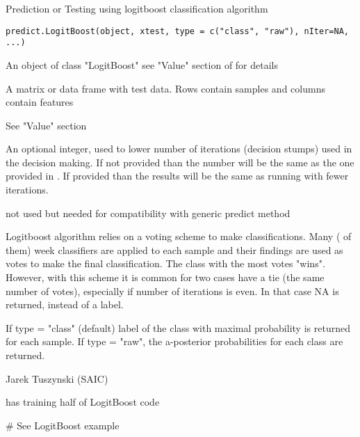 \begin{Description}\relax
Prediction or Testing using logitboost classification algorithm
\end{Description}
\begin{Usage}
\begin{verbatim}predict.LogitBoost(object, xtest, type = c("class", "raw"), nIter=NA, ...)\end{verbatim}
\end{Usage}
\begin{Arguments}
\begin{ldescription}
\item[\code{object}] An object of class "LogitBoost" see "Value" section of 
 for details
\item[\code{xtest}] A matrix or data frame with test data. Rows contain samples 
and columns contain features
\item[\code{type}] See "Value" section
\item[\code{nIter}] An optional integer, used to lower number of iterations 
(decision stumps) used in the decision making. If not provided than the 
number will be the same as the one provided in . 
If provided than the results will be the same as running 
 with fewer iterations. 
\item[\code{...}] not used but needed for compatibility with generic predict 
method
\end{ldescription}
\end{Arguments}
\begin{Details}\relax
Logitboost algorithm relies on a voting scheme to make classifications. Many
( of them) week classifiers are applied to each sample and their
findings are used as votes to make the final classification. The class with 
the most votes "wins". However, with this scheme it is common for two cases 
have a tie (the same number of votes), especially if number of iterations is 
even. In that case NA is returned, instead of a label.
\end{Details}
\begin{Value}
If type = "class" (default) label of the class with maximal probability is 
returned for each sample. If type = "raw", the a-posterior probabilities for 
each class are returned.
\end{Value}
\begin{Author}\relax
Jarek Tuszynski (SAIC) 
\end{Author}
\begin{SeeAlso}\relax
{} has training half of LogitBoost code
\end{SeeAlso}
\begin{Examples}
\begin{ExampleCode}# See LogitBoost example\end{ExampleCode}
\end{Examples}

